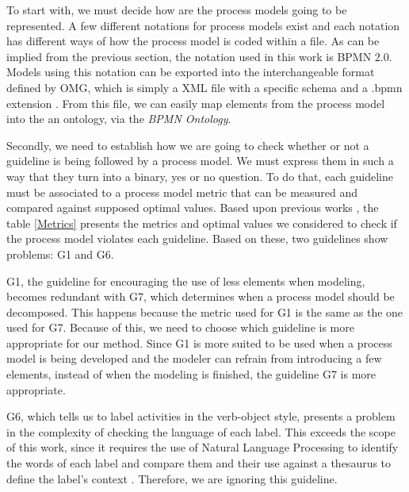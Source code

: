 \documentclass[a4paper,twoside]{article}
\begin{document}
To start with, we must decide how are the process models going to be represented. A few different notations for process models exist and each notation has different ways of how the process model is coded within a file. As can be implied from the previous section, the notation used in this work is BPMN 2.0. Models using this notation can be exported into the interchangeable format defined by OMG, which is simply a XML file with a specific schema and a .bpmn extension \cite{OMGObjectManagementGroup2015}. From this file, we can easily map elements from the process model into the an ontology, via the \textit{BPMN Ontology}.

Secondly, we need to establish how we are going to check whether or not a guideline is being followed by a process model. We must express them in such a way that they turn into a binary, yes or no question. To do that, each guideline must be associated to a process model metric that can be measured and compared against supposed optimal values. Based upon previous works \cite{Mendling2008} \cite{Recker2011} \cite{Mendling:2012}, the table \ref{Metrics} presents the metrics and optimal values we considered to check if the process model violates each guideline. Based on these, two guidelines show problems: G1 and G6.


G1, the guideline for encouraging the use of less elements when modeling, becomes redundant with G7, which determines when a process model should be decomposed. This happens because the metric used for G1 is the same as the one used for G7. Because of this, we need to choose which guideline is more appropriate for our method. Since G1 is more suited to be used when a process model is being developed and the modeler can refrain from introducing a few elements, instead of when the modeling is finished, the guideline G7 is more appropriate.

G6, which tells us to label activities in the verb-object style, presents a problem in the complexity of checking the language of each label. This exceeds the scope of this work, since it requires the use of Natural Language Processing to identify the words of each label and compare them and their use against a thesaurus to define the label's context \cite{Gassen2014}. Therefore, we are ignoring this guideline.
\end{document}
